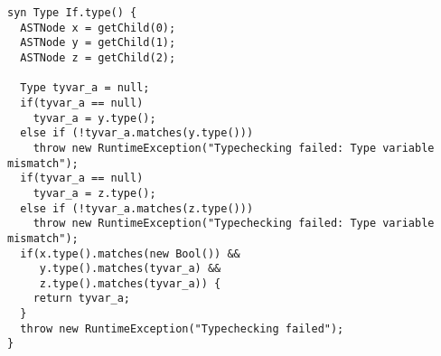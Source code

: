 \documentclass[nofilelist]{cslthse-msc}
\begin{document}
\pagebreak
\begin{lstlisting}[language=jrag, linewidth=350pt]
syn Type If.type() {
  ASTNode x = getChild(0);
  ASTNode y = getChild(1);
  ASTNode z = getChild(2);

  Type tyvar_a = null;
  if(tyvar_a == null)
    tyvar_a = y.type();
  else if (!tyvar_a.matches(y.type()))
    throw new RuntimeException("Typechecking failed: Type variable mismatch");
  if(tyvar_a == null)
    tyvar_a = z.type();
  else if (!tyvar_a.matches(z.type()))
    throw new RuntimeException("Typechecking failed: Type variable mismatch");
  if(x.type().matches(new Bool()) &&
     y.type().matches(tyvar_a) &&
     z.type().matches(tyvar_a)) {
    return tyvar_a;
  }
  throw new RuntimeException("Typechecking failed");
}
\end{lstlisting}
\end{document}
